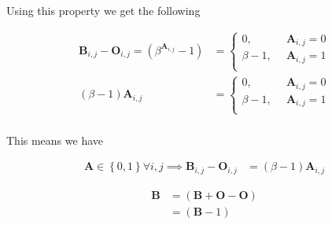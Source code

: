 \documentclass[11pt]{report}
\begin{document}
Using this property we get the following


\begin{align*}
\mathbf{B}_{i,j}- \mathbf{O}_{i,j} = \left( \beta^{\mathbf{A}_{i,j}} -1 \right) &=
\begin{cases}
    0      , &\enspace \mathbf{A}_{i,j}=0  \\
    \beta-1, &\enspace \mathbf{A}_{i,j}=1  \\
\end{cases} \\
\left( \beta- 1 \right) \mathbf{A}_{i,j} &=
\begin{cases}
    0      , &\enspace \mathbf{A}_{i,j}=0  \\
    \beta-1, &\enspace \mathbf{A}_{i,j}=1  \\
\end{cases} \\
\end{align*}


This means we have


\begin{align*}
\mathbf{A} \in \left\{0, 1\right\} \forall i,j  \implies   \mathbf{B}_{i,j}- \mathbf{O}_{i,j} &= \left( \beta-1 \right) \mathbf{A}_{i,j}
\end{align*}



\begin{align*}
\mathbf{B}&= \left( \mathbf{B}+  \mathbf{O}- \mathbf{O} \right) \\
&= \left( \mathbf{B}- 1 \right)
\end{align*}
\end{document}
